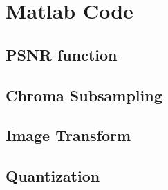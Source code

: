 \appendix
\newpage

\section{Matlab Code}
\subsection{PSNR function}


\subsection{Chroma Subsampling}


\subsection{Image Transform}


\subsection{Quantization}





